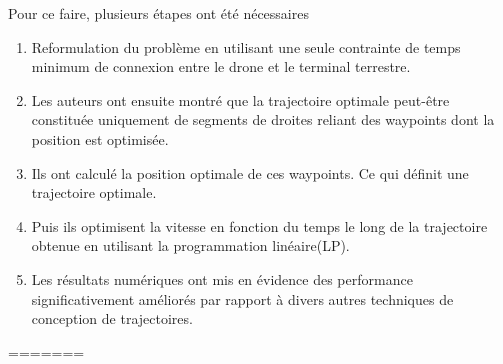 \documentclass[utf8, a4paper]{beamer}
\begin{document}
\begin{frame} {}
 Pour ce faire, plusieurs étapes ont été nécessaires\pause

\begin{enumerate}
	\item Reformulation du problème en utilisant une seule contrainte
	de temps minimum de connexion entre le drone et le terminal terrestre.
	\pause
	
	\item Les auteurs ont ensuite montré que la trajectoire optimale
	peut-être constituée uniquement de segments de droites reliant des
	waypoints dont la position est optimisée.
	\pause
	\item Ils ont calculé la position optimale de ces waypoints.
	Ce qui définit une trajectoire optimale. 
	\pause  
	\item Puis ils optimisent la vitesse en fonction du temps le long de la trajectoire obtenue
	en utilisant la programmation linéaire(LP).
	\pause
	\item Les résultats numériques ont mis en évidence des performance significativement améliorés
	 par rapport à divers autres techniques de conception de trajectoires.

\end{enumerate}
\end{frame}

=======








\end{document}

